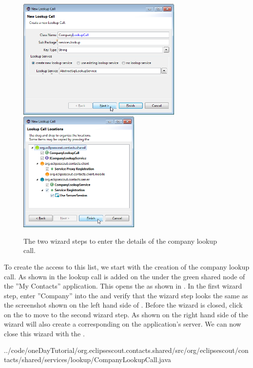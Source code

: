 \documentclass[a4paper,10pt,twoside]{book}
\begin{document}
\begin{figure}
\includegraphics[height=6cm]{new_lookupcall_company_1.png} \hspace{5mm}
\includegraphics[height=6cm]{new_lookupcall_company_2.png}
\caption{The two wizard steps to enter the details of the company lookup call.}
\end{figure}

To create the access to this list, we start with the creation of the company lookup call. 
As shown in  the lookup call is added on the  under the green shared node of the ''My Contacts'' application.
This opens the  as shown in . 
In the first wizard step, enter ''Company'' into the  and verify that the wizard step looks the same as the screenshot shown on the left hand side of .
Before the wizard is closed, click on the  to move to the second wizard step. 
As shown on the right hand side of  the wizard will also create a corresponding  on the application's server. 
We can now close this wizard with the .


{../code/oneDayTutorial/org.eclipsescout.contacts.shared/src/org/eclipsescout/contacts/shared/services/lookup/CompanyLookupCall.java}
\end{document}
